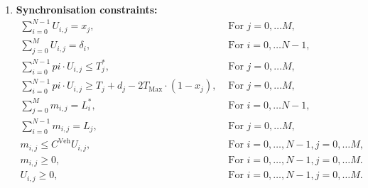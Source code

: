 \documentclass[11pt]{article}
\theoremstyle{plain}%
\theoremstyle{definition} \newtheorem{lem}{Lemma}[section]
\theoremstyle{definition} \newtheorem{claim}{Claim}[lem]
\theoremstyle{definition} \newtheorem{theorem}{Theorem}[section]
\theoremstyle{definition} \newtheorem{exo}{Exercice n$^\circ$}
\theoremstyle{definition} \newtheorem{quest}{}[exo]
\theoremstyle{definition} \newtheorem{sousquest}{}[quest]
\theoremstyle{remark}
\theoremstyle{definition}
\begin{document}
\begin{enumerate}
\item {\bf Synchronisation constraints:}
\begin{eqnarray}	
\sum_{i=0}^{ N-1} U_{i,j}=x_j,  & \textrm{ For }  j = 0, \ldots M ,&\label{Prod23} \\
\sum_{j=0}^{ M} U_{i,j} =\delta_i,  & \textrm{ For  } i=0, \ldots N-1,&\label{Prod24} \\
\sum_{i=0}^{ N-1} pi \cdot U_{i,j} \le  T^*_j, &  \textrm{ For }  j= 0, \ldots M,&\label{Prod25} \\
\sum_{i=0}^{ N-1} pi \cdot U_{i,j}  \geq T_j + d_j-2T_{\textrm{Max}} \cdot (1-x_j),&\textrm{ For  } j = 0, \ldots M ,&\label{Prod26} \\
\sum_{j=0}^{  M} m_{i,j} =L^*_i, &  \textrm{ For }  i= 0, \ldots N-1,&\label{Prod27} \\ 
\sum_{i=0}^{  N-1} m_{i,j} =L_j, &  \textrm{ For }  j= 0, \ldots M,&\label{Prod28} \\ 
m_{i,j} \leq C^{\textrm{Veh}}U_{i,j},& \textrm{ For }  i= 0, \ldots, N-1, j = 0, \ldots M, & \label{Prod29} \\ 
m_{i,j} \geq 0,& \textrm{ For }  i= 0, \ldots, N-1, j = 0, \ldots M .& \label{Prod30}\\
U_{i,j} \geq 0,& \textrm{ For }  i= 0, \ldots, N-1, j = 0, \ldots M .& \label{Prod31}  
\end{eqnarray}


\end{enumerate}
\end{document}

